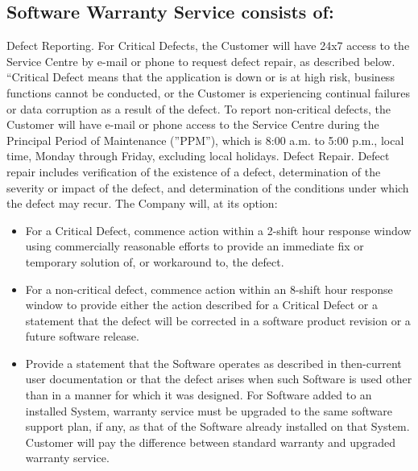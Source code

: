 \subsection{Software Warranty Service consists of:}
Defect Reporting. For Critical Defects, the Customer will have 24x7 access to the Service Centre by e-mail or phone to request defect repair, as described below. “Critical Defect means that the
application is down or is at high risk, business functions cannot be conducted, or the Customer is experiencing continual failures or data corruption as a result of the defect. To report non-critical
defects, the Customer will have e-mail or phone access to the Service Centre during the Principal Period of Maintenance (”PPM”), which is 8:00 a.m. to 5:00 p.m., local time, Monday through Friday,
excluding local holidays. Defect Repair. Defect repair includes verification of the existence of a defect, determination of the
severity or impact of the defect, and determination of the conditions under which the defect may recur. 
The Company will, at its option: 
\begin{itemize}
\item For a Critical Defect, commence action within a 2-shift hour response window using commercially reasonable efforts to provide an immediate fix or temporary solution of, or workaround
to, the defect.
\item For a non-critical defect, commence action within an 8-shift hour response window to provide either the action described for a Critical Defect or a statement that the defect will be corrected
in a software product revision or a future software release.
\item Provide a statement that the Software operates as described in then-current user documentation or that the defect arises when such Software is used other than in a manner for which it
was designed. For Software added to an installed System, warranty service must be upgraded to the same software support plan, if any, as that of the Software already installed on that
System. Customer will pay the difference between standard warranty and upgraded warranty
service.
\end{itemize}





